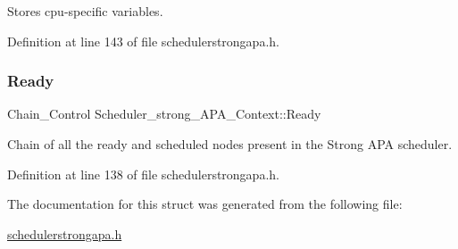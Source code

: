 Stores cpu-\/specific variables. 



Definition at line 143 of file schedulerstrongapa.\+h.

\mbox{\label{structScheduler__strong__APA__Context_a0c445c35a07b8aa14f9d76c6dfb4916c}} 
\subsubsection{\texorpdfstring{Ready}{Ready}}
{\footnotesize\ttfamily Chain\+\_\+\+Control Scheduler\+\_\+strong\+\_\+\+A\+P\+A\+\_\+\+Context\+::\+Ready}



Chain of all the ready and scheduled nodes present in the Strong A\+PA scheduler. 



Definition at line 138 of file schedulerstrongapa.\+h.



The documentation for this struct was generated from the following file\+:\begin{DoxyCompactItemize}
\item 
\hyperlink{schedulerstrongapa_8h}{schedulerstrongapa.\+h}\end{DoxyCompactItemize}
